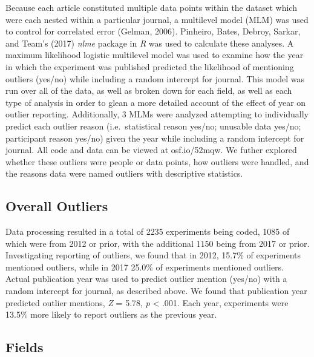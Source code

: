 \documentclass[english,man]{apa6}
\theoremstyle{definition}
\theoremstyle{definition}
\theoremstyle{definition}
\theoremstyle{remark}
\begin{document}
Because each article constituted multiple data points within the dataset
which were each nested within a particular journal, a multilevel model
(MLM) was used to control for correlated error (Gelman, 2006). Pinheiro,
Bates, Debroy, Sarkar, and Team's (2017) \emph{nlme} package in \emph{R}
was used to calculate these analyses. A maximum likelihood logistic
multilevel model was used to examine how the year in which the
experiment was published predicted the likelihood of mentioning outliers
(yes/no) while including a random intercept for journal. This model was
run over all of the data, as well as broken down for each field, as well
as each type of analysis in order to glean a more detailed account of
the effect of year on outlier reporting. Additionally, 3 MLMs were
analyzed attempting to individually predict each outlier reason
(i.e.~statistical reason yes/no; unusable data yes/no; participant
reason yes/no) given the year while including a random intercept for
journal. All code and data can be viewed at osf.io/52mqw. We futher
explored whether these outliers were people or data points, how outliers
were handled, and the reasons data were named outliers with descriptive
statistics.

\subsection{Overall Outliers}\label{overall-outliers}

Data processing resulted in a total of 2235 experiments being coded,
1085 of which were from 2012 or prior, with the additional 1150 being
from 2017 or prior. Investigating reporting of outliers, we found that
in 2012, 15.7\% of experiments mentioned outliers, while in 2017 25.0\%
of experiments mentioned outliers. Actual publication year was used to
predict outlier mention (yes/no) with a random intercept for journal, as
described above. We found that publication year predicted outlier
mentions, \emph{Z} = 5.78, \emph{p} \textless{} .001. Each year,
experiments were 13.5\% more likely to report outliers as the previous
year.

\subsection{Fields}\label{fields-1}
\end{document}

